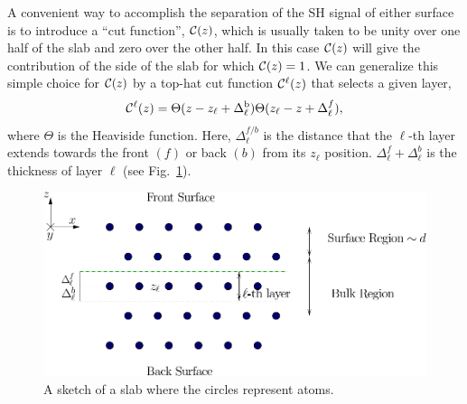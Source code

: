 \documentclass[floatfix,prb,aps,superscriptaddress,11pt,preprint,letterpaper]{revtex4}
\begin{document}
A convenient way to accomplish the separation of the SH signal of
either surface is to introduce a ``cut function'', ${\mathbf{\cal C}}(z)$, which is 
usually taken to be unity over one half of the slab and zero over 
the other half.\cite{reining_microscopic_1994}
 In this case ${\mathbf{\cal C}}(z)$ will give the contribution of the 
side of the slab for which ${\mathbf{\cal C}}(z)=1$. We can generalize this 
simple choice for ${\mathbf{\cal C}}(z)$ by a top-hat cut function
${\mathbf{\cal C}}^\ell(z)$ that selects a given layer,
\begin{equation}
\label{sz}
{\mathbf{\cal C}}^\ell(z)=\Theta(z-z_\ell+\Delta_\ell^{\mathrm{b}})
            \Theta(z_\ell-z+\Delta_\ell^f),
\end{equation}
where $\Theta$ is the Heaviside function. Here, $\Delta_\ell^{f/b}$
is the distance that the $\ell$-th layer extends towards the front
$(f)$ or back $(b)$ from its $z_\ell$ position. 
$\Delta_\ell^f+\Delta_\ell^b$ is the thickness of layer $\ell$ 
(see Fig.~\ref{fslab}).
\begin{figure}[b]
\centering
\includegraphics[scale=.7]{images/slab}
\caption{A sketch of a slab where the circles represent atoms.\label{fslab}}
\end{figure}
\end{document}
